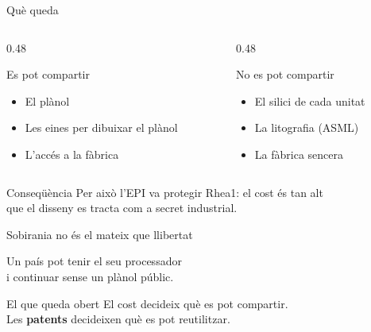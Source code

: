 \documentclass[catalan]{beamer}
\begin{document}
\begin{frame}{Què queda}
  \begin{columns}[T]
    \begin{column}{0.48\textwidth}
      \begin{exampleblock}{Es pot compartir}
        \begin{itemize}
          \item El plànol
          \item Les eines per dibuixar el plànol
          \item L'accés a la fàbrica
        \end{itemize}
      \end{exampleblock}
    \end{column}
    \begin{column}{0.48\textwidth}
      \begin{alertblock}{No es pot compartir}
        \begin{itemize}
          \item El silici de cada unitat
          \item La litografia (ASML)
          \item La fàbrica sencera
        \end{itemize}
      \end{alertblock}
    \end{column}
  \end{columns}
  \vspace{0.4cm}
  \begin{block}{Conseqüència}
    Per això l'EPI va protegir Rhea1: el cost és tan alt\\
    que el disseny es tracta com a secret industrial.
  \end{block}
\end{frame}

\begin{frame}{Sobirania no és el mateix que llibertat}
  \begin{center}
    \Large Un país pot tenir el seu processador\\
    i continuar sense un plànol públic.
  \end{center}
  \vspace{0.55cm}
  \begin{block}{El que queda obert}
    El cost decideix què es pot compartir.\\
    Les \textbf{patents} decideixen què es pot reutilitzar.
  \end{block}
\end{frame}
\end{document}
